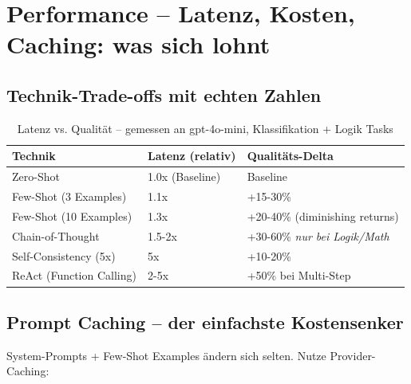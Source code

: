 
\section{Performance -- Latenz, Kosten, Caching: was sich lohnt}

\subsection{Technik-Trade-offs mit echten Zahlen}

\begin{table}[H]
\centering
\begin{tabularx}{\linewidth}{lXX}
\toprule
\textbf{Technik} & \textbf{Latenz (relativ)} & \textbf{Qualitäts-Delta} \\
\midrule
Zero-Shot & 1.0x (Baseline) & Baseline \\
Few-Shot (3 Examples) & 1.1x & +15-30\% \\
Few-Shot (10 Examples) & 1.3x & +20-40\% (diminishing returns) \\
Chain-of-Thought & 1.5-2x & +30-60\% \textit{nur bei Logik/Math} \\
Self-Consistency (5x) & 5x & +10-20\% \\
ReAct (Function Calling) & 2-5x & +50\% bei Multi-Step \\
\midrule
\end{tabularx}
\caption{Latenz vs. Qualität -- gemessen an gpt-4o-mini, Klassifikation + Logik Tasks}
\label{tab:latency-quality}
\end{table}


\subsection{Prompt Caching -- der einfachste Kostensenker}

System-Prompts + Few-Shot Examples ändern sich selten. Nutze Provider-Caching:

